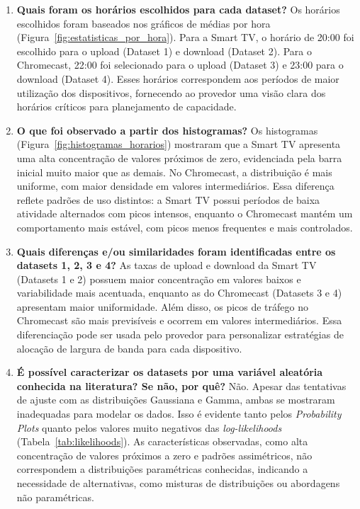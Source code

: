 \begin{enumerate}
    \item \textbf{Quais foram os horários escolhidos para cada dataset?}  
    Os horários escolhidos foram baseados nos gráficos de médias por hora (Figura~\ref{fig:estatisticas_por_hora}). Para a Smart TV, o horário de 20:00 foi escolhido para o upload (Dataset 1) e download (Dataset 2). Para o Chromecast, 22:00 foi selecionado para o upload (Dataset 3) e 23:00 para o download (Dataset 4). Esses horários correspondem aos períodos de maior utilização dos dispositivos, fornecendo ao provedor uma visão clara dos horários críticos para planejamento de capacidade.

    \item \textbf{O que foi observado a partir dos histogramas?}  
    Os histogramas (Figura~\ref{fig:histogramas_horarios}) mostraram que a Smart TV apresenta uma alta concentração de valores próximos de zero, evidenciada pela barra inicial muito maior que as demais. No Chromecast, a distribuição é mais uniforme, com maior densidade em valores intermediários. Essa diferença reflete padrões de uso distintos: a Smart TV possui períodos de baixa atividade alternados com picos intensos, enquanto o Chromecast mantém um comportamento mais estável, com picos menos frequentes e mais controlados.

    \item \textbf{Quais diferenças e/ou similaridades foram identificadas entre os datasets 1, 2, 3 e 4?}  
    As taxas de upload e download da Smart TV (Datasets 1 e 2) possuem maior concentração em valores baixos e variabilidade mais acentuada, enquanto as do Chromecast (Datasets 3 e 4) apresentam maior uniformidade. Além disso, os picos de tráfego no Chromecast são mais previsíveis e ocorrem em valores intermediários. Essa diferenciação pode ser usada pelo provedor para personalizar estratégias de alocação de largura de banda para cada dispositivo.

    \item \textbf{É possível caracterizar os datasets por uma variável aleatória conhecida na literatura? Se não, por quê?}  
    Não. Apesar das tentativas de ajuste com as distribuições Gaussiana e Gamma, ambas se mostraram inadequadas para modelar os dados. Isso é evidente tanto pelos \textit{Probability Plots} quanto pelos valores muito negativos das \textit{log-likelihoods} (Tabela~\ref{tab:likelihoods}). As características observadas, como alta concentração de valores próximos a zero e padrões assimétricos, não correspondem a distribuições paramétricas conhecidas, indicando a necessidade de alternativas, como misturas de distribuições ou abordagens não paramétricas.


\end{enumerate}
